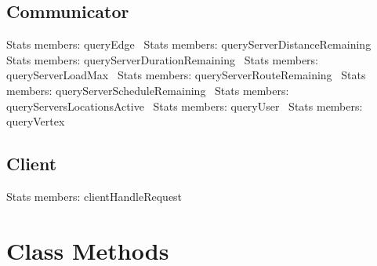 \subsection{Communicator}
\nwenddocs{}\plusendmoddef
\LA{}Stats members: queryEdge~{\nwtagstyle{}}\RA{}
\LA{}Stats members: queryServerDistanceRemaining~{\nwtagstyle{}}\RA{}
\LA{}Stats members: queryServerDurationRemaining~{\nwtagstyle{}}\RA{}
\LA{}Stats members: queryServerLoadMax~{\nwtagstyle{}}\RA{}
\LA{}Stats members: queryServerRouteRemaining~{\nwtagstyle{}}\RA{}
\LA{}Stats members: queryServerScheduleRemaining~{\nwtagstyle{}}\RA{}
\LA{}Stats members: queryServersLocationsActive~{\nwtagstyle{}}\RA{}
\LA{}Stats members: queryUser~{\nwtagstyle{}}\RA{}
\LA{}Stats members: queryVertex~{\nwtagstyle{}}\RA{}
\nwendcode{}\nwdocspar

\subsection{Client}
\nwenddocs{}\plusendmoddef
\LA{}Stats members: clientHandleRequest~{\nwtagstyle{}}\RA{}
\nwendcode{}\nwdocspar

\section{Class Methods}
